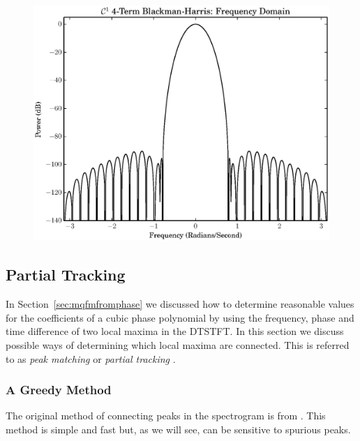 \documentclass[letterpaper,12pt]{report}
\begin{document}
\begin{figure}
    \caption{}
    \includegraphics[width=\textwidth]{plots/c1_blackman_fd.eps}
\end{figure}

\subsection{\label{sec:partialtracking}Partial Tracking}

In Section~\ref{sec:mqfmfromphase} we discussed how to determine reasonable
values for the coefficients of a cubic phase polynomial by using the frequency,
phase and time difference of two local maxima in the DTSTFT. In this section we
discuss possible ways of determining which local maxima are connected. This is
referred to as \textit{peak matching} \cite{mcaulay1986speech}
or \textit{partial tracking} \cite{smith1987parshl} \cite{depalle1993tracking}.

\subsubsection{A Greedy Method}

The original method of connecting peaks in the spectrogram is from
\cite{mcaulay1986speech}. This method is simple and fast but, as we will see,
can be sensitive to spurious peaks.
\end{document}
